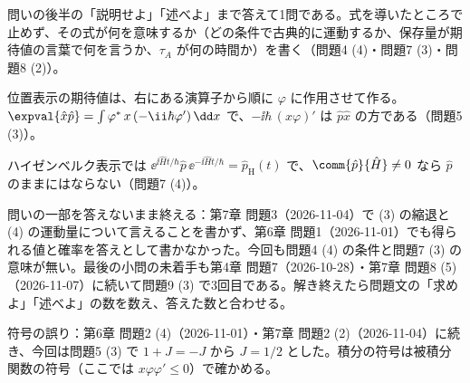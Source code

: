 \documentclass[uplatex,dvipdfmx,a4paper,11pt]{jsarticle}
\begin{document}
\matome
\begin{saitenichiran}
\end{saitenichiran}
\begin{daiji}
  \item 問いの後半の「説明せよ」「述べよ」まで答えて1問である。式を導いたところで止めず、その式が何を意味するか（どの条件で古典的に運動するか、保存量が期待値の言葉で何を言うか、$\tau_{A}$ が何の時間か）を書く（問題4 (4)・問題7 (3)・問題8 (2)）。
  \item 位置表示の期待値は、右にある演算子から順に $\varphi$ に作用させて作る。$\expval{\hat{x}\hat{p}}=\int\varphi^{*}\,x\,(-\ii\hbar\varphi')\,\dd x$ で、$-\ii\hbar\,(x\varphi)'$ は $\hat{p}\hat{x}$ の方である（問題5 (3)）。
  \item ハイゼンベルク表示では $\ee^{\ii\hat{H}t/\hbar}\hat{p}\,\ee^{-\ii\hat{H}t/\hbar}=\hat{p}_{\mathrm{H}}(t)$ で、$\comm{\hat{p}}{\hat{H}}\neq0$ なら $\hat{p}$ のままにはならない（問題7 (4)）。
\end{daiji}
\begin{maemo}
  \item 問いの一部を答えないまま終える：第7章 問題3（2026-11-04）で (3) の縮退と (4) の運動量について言えることを書かず、第6章 問題1（2026-11-01）でも得られる値と確率を答えとして書かなかった。今回も問題4 (4) の条件と問題7 (3) の意味が無い。最後の小問の未着手も第4章 問題7（2026-10-28）・第7章 問題8 (5)（2026-11-07）に続いて問題9 (3) で3回目である。解き終えたら問題文の「求めよ」「述べよ」の数を数え、答えた数と合わせる。
  \item 符号の誤り：第6章 問題2 (4)（2026-11-01）・第7章 問題2 (2)（2026-11-04）に続き、今回は問題5 (3) で $1+J=-J$ から $J=1/2$ とした。積分の符号は被積分関数の符号（ここでは $x\varphi\varphi'\le0$）で確かめる。
\end{maemo}
\end{document}
